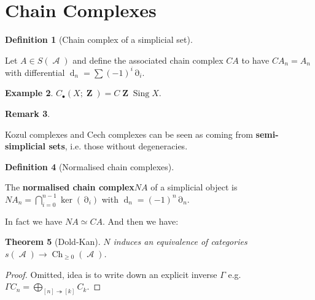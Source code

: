 \documentclass[10pt,]{book}
\newcommand{\terminology}[1]{\textbf{#1}}
\theoremstyle{plain}
\newtheorem{theorem}{Theorem}[section]
\theoremstyle{definition}
\newtheorem{definition}[theorem]{Definition}
\newtheorem{example}[theorem]{Example}
\newtheorem{remark}[theorem]{Remark}
\numberwithin{equation}{section}
\DeclareMathOperator{\Sing}{Sing}
\DeclareMathOperator{\Ch}{Ch}
\DeclareMathOperator{\cA}{\mathcal{A}}
\DeclareMathOperator{\dd}{\partial}
\DeclareMathOperator{\rd}{\mathrm{d}}
\DeclareMathOperator{\ZZ}{\mathbf{Z}}
\begin{document}
\section[Chain Complexes]{Chain Complexes}\label{sec-simp-chain-complexes}
\begin{definition}[Chain complex of a simplicial set]\label{definition-26}

            Let \(A \in S(\cA)\) and define the associated chain complex \(CA\) to have \(CA_n = A_n\) with differential \(\rd_n = \sum (-1)^i \dd_i\).
          \end{definition}
\begin{example}\label{example-18}
\(C_\bullet(X; \ZZ) = C\ZZ\Sing X\).
          \end{example}
\begin{remark}\label{remark-3}

            Kozul complexes and Cech complexes can be seen as coming from \terminology{semi-simplicial sets}, i.e. those without degeneracies.
          \end{remark}
\begin{definition}[Normalised chain complexes]\label{definition-27}

            The \terminology{normalised chain complex}\(NA\) of a simplicial object is \(NA_n = \bigcap_{i=0}^{n-1} \ker(\dd_i)\) with \(\rd_n = (-1)^n \dd_n\). \end{definition}

          In fact we have \(NA \simeq CA\).
          And then we have:
\begin{theorem}[Dold-Kan]\label{theorem-5}
\(N\) induces an equivalence of categories \(s(\cA) \to \Ch_{\ge 0}(\cA)\).
          \end{theorem}
\begin{proof}
Omitted, idea is to write down an explicit inverse \(\Gamma\) e.g. \(\Gamma C_n = \bigoplus_{[n]\twoheadrightarrow [k]} C_k\).\end{proof}
\typeout{************************************************}
\typeout{************************************************}
\end{document}
